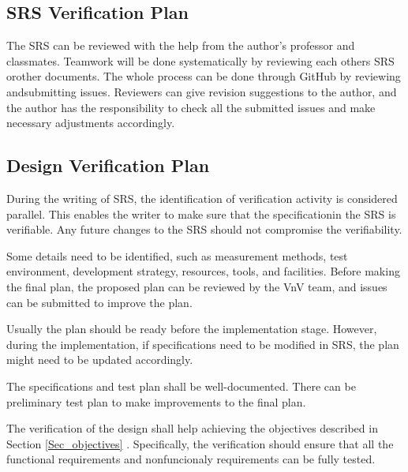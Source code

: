 \documentclass[12pt, titlepage]{article}
\begin{document}
\subsection{SRS Verification Plan}

The SRS can be reviewed with the help from the author's professor and
classmates. Teamwork will be done systematically by reviewing each others SRS
orother documents. The whole process can be done through GitHub by reviewing
andsubmitting issues. Reviewers can give revision suggestions to the author, and
the author has the responsibility to check all the submitted issues and make
necessary adjustments accordingly.

\subsection{Design Verification Plan}

During the writing of SRS, the identification of verification activity is
considered parallel. This enables the writer to make sure that the
specificationin the SRS is verifiable. Any future changes to the SRS should not
compromise
the verifiability. 

Some details need to be identified, such as measurement methods, test
environment, development strategy, resources, tools, and facilities. Before
making the final plan, the proposed plan can be reviewed by the VnV team, and
issues can be submitted to improve the plan.

Usually the plan should be ready before the implementation stage. However,
during the implementation, if specifications need to be modified in SRS, the
plan
might need to be updated accordingly.

The specifications and test plan shall be well-documented. There can be
preliminary test plan to make improvements to the final plan.



The verification of the design shall help achieving the objectives described in
Section \ref{Sec_objectives} \cite{Michalski2019SystVnv}. Specifically,
the verification should ensure that all the functional requirements and
nonfuncionaly requirements can be fully tested.
\end{document}
